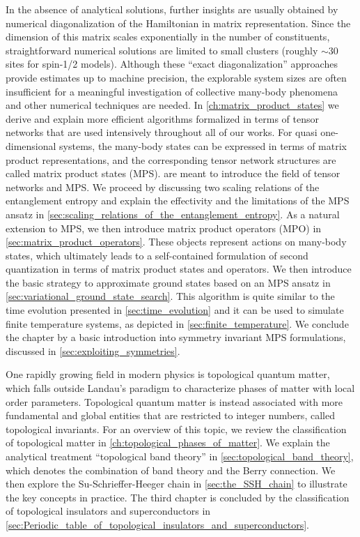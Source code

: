 In the absence of analytical solutions, further insights are usually obtained by numerical diagonalization of the Hamiltonian in matrix representation.
Since the dimension of this matrix scales exponentially in the number of constituents, straightforward numerical solutions are limited to small clusters (roughly $\sim 30$ sites for spin-1/2 models).
Although these ``exact diagonalization'' approaches provide estimates up to machine precision, the explorable system sizes are often insufficient for a meaningful investigation of collective many-body phenomena and other numerical techniques are needed.
In \cref{ch:matrix_product_states} we derive and explain more efficient algorithms formalized in terms of tensor networks that are used intensively throughout all of our works.
For quasi one-dimensional systems, the many-body states can be expressed in terms of matrix product representations, and the corresponding tensor network structures are called matrix product states (MPS).
 are meant to introduce the field of tensor networks and MPS.
We proceed by discussing two scaling relations of the entanglement entropy and explain the effectivity and the limitations of the MPS ansatz in \cref{sec:scaling_relations_of_the_entanglement_entropy}.
As a natural extension to MPS, we then introduce matrix product operators (MPO) in \cref{sec:matrix_product_operators}.
These objects represent actions on many-body states, which ultimately leads to a self-contained formulation of second quantization in terms of matrix product states and operators.
We then introduce the basic strategy to approximate ground states based on an MPS ansatz in \cref{sec:variational_ground_state_search}.
This algorithm is quite similar to the time evolution presented in \cref{sec:time_evolution} and it can be used to simulate finite temperature systems, as depicted in \cref{sec:finite_temperature}.
We conclude the chapter by a basic introduction into symmetry invariant MPS formulations, discussed in \cref{sec:exploiting_symmetries}.

One rapidly growing field in modern physics is topological quantum matter, which falls outside Landau's paradigm to characterize phases of matter with local order parameters.
Topological quantum matter is instead associated with more fundamental and global entities that are restricted to integer numbers, called topological invariants.
For an overview of this topic, we review the classification of topological matter in \cref{ch:topological_phases_of_matter}.
We explain the analytical treatment ``topological band theory'' in \cref{sec:topological_band_theory}, which denotes the combination of band theory and the Berry connection.
We then explore the Su-Schrieffer-Heeger chain in \cref{sec:the_SSH_chain} to illustrate the key concepts in practice.
The third chapter is concluded by the classification of topological insulators and superconductors in \cref{sec:Periodic_table_of_topological_insulators_and_superconductors}.

